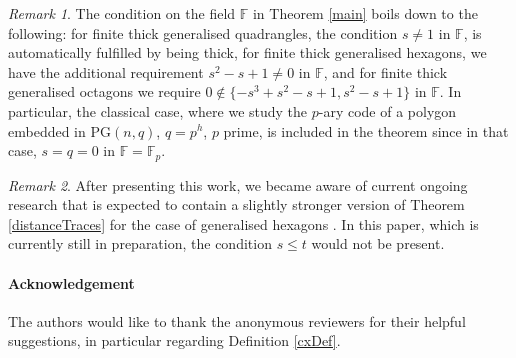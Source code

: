 \documentclass[12pt]{article}
\newcommand{\F}{\mathbb{F}}
\newcommand{\PG}{\mathrm{PG}}
\theoremstyle{remark}
\newtheorem{remark}{Remark}
\begin{document}
\begin{remark}
	The condition on the field $\F$ in Theorem \ref{main} boils down to the following: for finite thick generalised quadrangles, the condition \(s\neq 1\) in $\F$, is automatically fulfilled by being thick, for finite thick generalised hexagons, we have the additional requirement \(s^2-s+1\neq 0\) in $\F$, and for finite thick generalised octagons we require \(0\notin \{-s^3+s^2-s+1, s^2-s+1\}\) in $\F$. 
    In particular, the classical case, where we study the $p$-ary code of a polygon embedded in $\PG(n,q)$, $q=p^h$, $p$ prime, is included in the theorem since in that case, $s=q=0$ in \(\F=\F_p\).
\end{remark}

\begin{remark} After presenting this work, we became aware of current ongoing research  that is expected to contain a slightly stronger version of Theorem \ref{distanceTraces} for the case of generalised hexagons \cite{SiraHendrik}. In this paper, which is currently still in preparation, the condition $s\leq t$ would not be present.
\end{remark}


\paragraph{Acknowledgement}
The authors would like to thank the anonymous reviewers for their helpful suggestions, in particular regarding Definition \ref{cxDef}.



\end{document}
